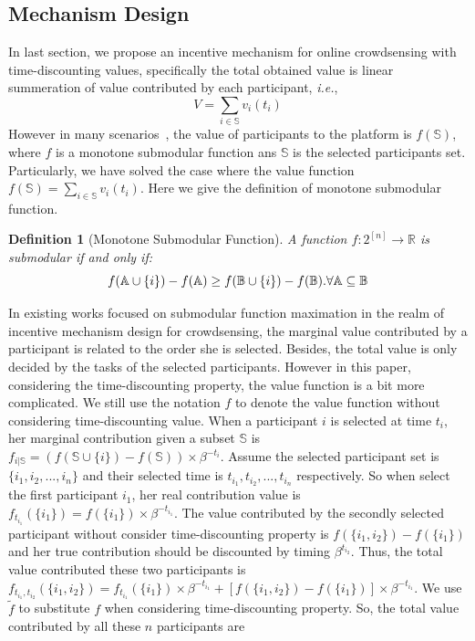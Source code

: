 \documentclass[conference,compsocconf,letterpaper,10pt]{IEEEtran}
\newtheorem{definition}{Definition}
\newcommand{\ie}{{\em i.e.}}
\begin{document}
\subsection{Mechanism Design}
In last section, we propose an incentive mechanism for online crowdsensing with time-discounting values, specifically the total obtained value is linear summeration of value contributed by each participant, \ie,
\begin{equation}
V=\sum\limits_{i \in \mathbb{S}}v_i(t_i)
\end{equation}
However in many scenarios~\cite{zhao2014crowdsource}, the value of participants to the platform is $f(\mathbb{S})$, where $f$ is a monotone submodular function ans $\mathbb{S}$ is the selected participants set. Particularly, we have solved the case where the value function $f(\mathbb{S})=\sum\limits_{i \in \mathbb{S}}v_i(t_i)$. Here we give the definition of monotone submodular function.
\begin{definition}[Monotone Submodular Function]
A function $f:2^{[n]}\to \mathbb{R}$ is submodular if and only if:
\begin{equation}
f(\mathbb{A}\cup\{i\})-f(\mathbb{A})\ge f(\mathbb{B}\cup \{i\})-f(\mathbb{B}). \forall \mathbb{A}\subseteq\mathbb{B} \notag
\end{equation}
\end{definition}
In existing works focused on submodular function maximation in the realm of incentive mechanism design for crowdsensing, the marginal value contributed by a participant is related to the order she is selected. Besides, the total value is only decided by the tasks of the selected participants. However in this paper, considering the time-discounting property, the value function is a bit more complicated. We still use the notation $f$ to denote the value function without considering time-discounting value. When a participant $i$ is selected at time $t_i$, her marginal contribution given a subset $\mathbb{S}$ is $f_{i|\mathbb{S}}=(f(\mathbb{S}\cup\{i\})-f(\mathbb{S}))\times\beta ^{-t_i}$.
Assume the selected participant set is $\{i_1,i_2,...,i_n\}$ and their selected time is $t_{i_1},t_{i_2},...,t_{i_n}$ respectively. So when select the first participant $i_1$, her real contribution value is $f_{t_{i_1}}(\{i_1\})=f(\{i_1\})\times \beta^{-t_{i_1}}$. The value contributed by the secondly selected participant without consider time-discounting property is $f(\{i_1,i_2\})-f(\{i_1\})$ and her true contribution should be discounted by timing $\beta^{t_{i_2}}$. Thus, the total value contributed these two participants is $f_{t_{i_1},t_{i_2}}(\{i_1,i_2\}) = f_{t_{i_1}}(\{i_1\})\times \beta^{-t_{i_1}} + [f(\{i_1,i_2\})-f(\{i_1\})]\times\beta^{-t_{i_1}}$. We use $\tilde{f}$ to substitute $f$ when considering time-discounting property. So, the total value contributed by all these $n$ participants are
\end{document}
